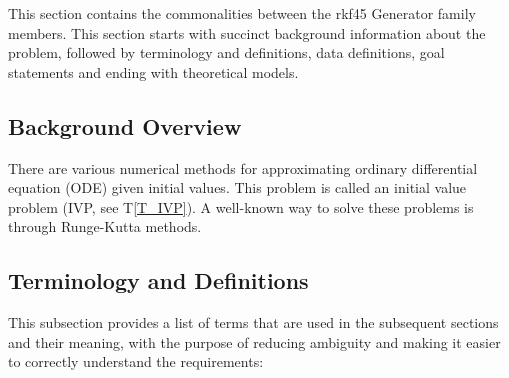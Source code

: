 \documentclass[12pt]{article}
\newcommand{\tref}[1]{T\ref{#1}}
\newcommand{\famname}{rkf45 Generator} %
\begin{document}
This section contains the commonalities between the \famname{} family members. 
This section starts with succinct background information about the problem, 
followed by terminology and definitions, data definitions, goal statements and 
ending with theoretical models. 

\subsection{Background Overview} \label{Sec_Background}

There are various numerical methods for approximating ordinary differential 
equation (ODE) given initial values. This problem is called an initial value 
problem (IVP, see \tref{T_IVP}). A well-known way to solve these problems is 
through Runge-Kutta methods.%

\subsection{Terminology and  Definitions}

This subsection provides a list of terms that are used in the subsequent
sections and their meaning, with the purpose of reducing ambiguity and making it
easier to correctly understand the requirements:
\end{document}
